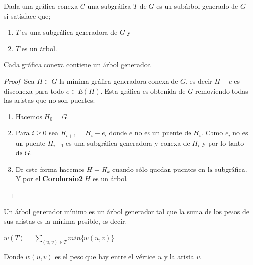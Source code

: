\begin{definition}
    Dada una gráfica conexa $G$ una subgráfica $T$ de $G$ es un subárbol generado de $G$ si satisface que;

    \begin{enumerate}
        \item $T$ es una subgráfica generadora de $G$ y
        \item $T$ es un árbol.
    \end{enumerate}
\end{definition}
\begin{teorema}
    Cada gráfica conexa contiene un árbol generador.
\end{teorema}
\begin{proof}
    Sea $H\subset G$ la mínima gráfica generadora conexa de $G$, es decir $H-e$ es disconexa para todo $e \in E(H)$.
    Esta gráfica es obtenida de $G$ removiendo todas las aristas que no son puentes:
    \begin{enumerate}
        \item Hacemos $H_0 = G$.
        \item Para $i \geq 0$ sea $H_{i+1} = H_i - e_i$ donde $e$ no es un puente de $H_i$. Como $e_i$ no es un puente $H_{i+1}$ es una subgráfica generadora y conexa de $H_i$ y por lo tanto de $G$.
        \item De este forma hacemos $H = H_k$ cuando sólo quedan puentes en la subgráfica.
        Y por el \textbf{Coroloraio2} $H$ es un árbol.
    \end{enumerate}
\end{proof}

\begin{definition}
    
    Un árbol generador mínimo es un árbol generador tal que la suma de los pesos de sus aristas es la mínima posible, es decir.
\begin{center}
    $w(T) = \sum_{(u,v) \in T} min\{w(u,v)\}$
\end{center}
Donde $w(u,v)$ es el peso que hay entre el vértice $u$ y la arista $v$.
\end{definition}




